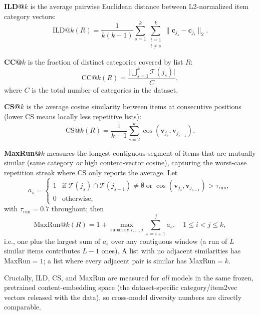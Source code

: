 \noindent\textbf{ILD@$k$} is the average pairwise Euclidean distance between L2-normalized item category vectors:
\begin{equation}
\text{ILD@}k(R) = \frac{1}{k(k-1)}\sum_{s=1}^{k}\sum_{\substack{t=1\\t\neq s}}^{k}
                  \bigl\|\mathbf{c}_{j_s} - \mathbf{c}_{j_t}\bigr\|_2.
\end{equation}

\noindent\textbf{CC@$k$} is the fraction of distinct categories covered by list $R$:
\begin{equation}
\text{CC@}k(R) = \frac{\bigl|\bigcup_{s=1}^{k} \mathcal{T}(j_s)\bigr|}{C},
\end{equation}
where $C$ is the total number of categories in the dataset.

\noindent\textbf{CS@$k$} is the average cosine similarity between items at consecutive positions (lower CS means locally less repetitive lists):
\begin{equation}
\text{CS@}k(R) = \frac{1}{k-1}\sum_{s=2}^{k} \cos(\mathbf{v}_{j_s}, \mathbf{v}_{j_{s-1}}).
\end{equation}

\noindent\textbf{MaxRun@$k$} measures the longest contiguous segment of items that are mutually similar (same category \emph{or} high content-vector cosine), capturing the worst-case repetition streak where CS only reports the average. Let
\begin{equation}
a_s = \begin{cases}
  1 & \text{if } \mathcal{T}(j_s)\cap\mathcal{T}(j_{s-1})\neq\emptyset \;\text{or}\;
      \cos(\mathbf{v}_{j_s},\mathbf{v}_{j_{s-1}}) > \tau_{\text{run}},\\
  0 & \text{otherwise},
\end{cases}
\end{equation}
with $\tau_{\text{run}}=0.7$ throughout; then
\begin{equation}
\text{MaxRun@}k(R) = 1 + \max_{\text{subarray } i,\dots,j} \sum_{s=i+1}^{j} a_s,
\quad 1 \leq i < j \leq k,
\end{equation}
i.e., one plus the largest sum of $a_s$ over any contiguous window (a run of $L$ similar items contributes $L-1$ ones). A list with no adjacent similarities has MaxRun$=1$; a list where every adjacent pair is similar has MaxRun$=k$.

Crucially, ILD, CS, and MaxRun are measured for \emph{all} models in the same frozen, pretrained content-embedding space (the dataset-specific category/item2vec vectors released with the data), so cross-model diversity numbers are directly comparable.

